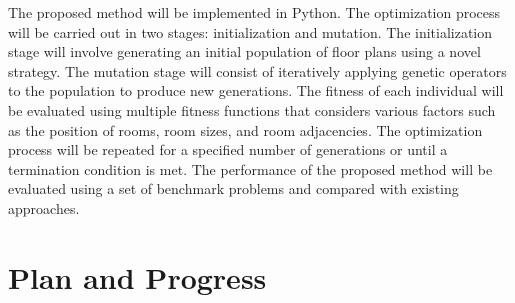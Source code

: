 \documentclass[]{article}
\begin{document}
The proposed method will be implemented in Python. The optimization process will be carried out in two stages: initialization and mutation. The initialization stage will involve generating an initial population of floor plans using a novel strategy. The mutation stage will consist of iteratively applying genetic operators to the population to produce new generations. The fitness of each individual will be evaluated using multiple fitness functions that considers various factors such as the position of rooms, room sizes, and room adjacencies. The optimization process will be repeated for a specified number of generations or until a termination condition is met. The performance of the proposed method will be evaluated using a set of benchmark problems and compared with existing approaches.


\section{Plan and Progress}
\end{document}
